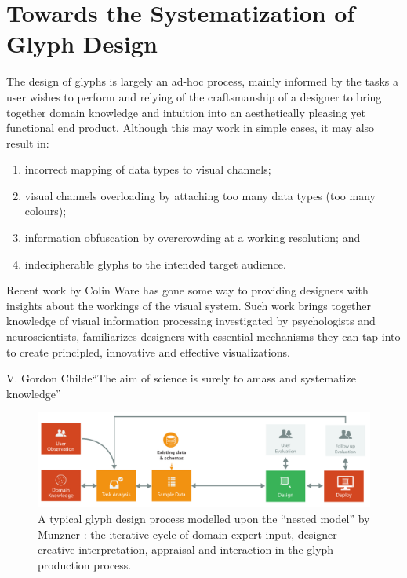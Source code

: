 \chapter{Towards the Systematization of Glyph Design}

\label{chap:strategies}
The design of glyphs is largely an ad-hoc process, mainly informed by the tasks a user wishes to perform and relying of the craftsmanship of a designer to bring together domain knowledge and intuition into an aesthetically pleasing yet functional end product.
Although this may work in simple cases, it may also result in: 
\begin{enumerate}
\item incorrect mapping of data types to visual channels; 
\item visual channels overloading by attaching too many data types (\eg too many colours); 
\item information obfuscation by overcrowding at a working resolution; and 
\item indecipherable glyphs to the intended target audience. 
\end{enumerate}

Recent work by Colin Ware \cite{ware13} has gone some way to providing designers with insights about the workings of the visual system. 
Such work brings together knowledge of visual information processing investigated by psychologists and neuroscientists, familiarizes designers with essential mechanisms they can tap into to create principled, innovative and effective visualizations.\\

%

\begin{chapquote}{V. Gordon Childe}{``The aim of science is surely to amass and systematize knowledge''}
\end{chapquote}

\begin{figure}[h!]
\centering
\includegraphics[width=\textwidth]{images/ch3/model_horizontal_simple}
\caption{A typical glyph design process modelled upon the ``nested model'' by Munzner \cite{munzner2009nested} : the iterative cycle of domain expert input, designer creative interpretation, appraisal and interaction in the glyph production process.}
\label{fig:simple_process}
\end{figure}


